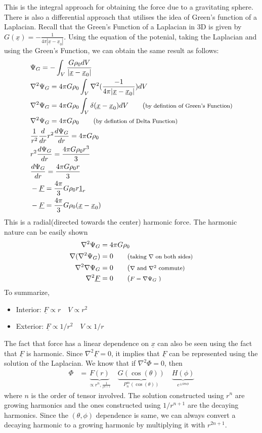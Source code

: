 \documentclass[11pt,a4paper]{article}
\newcommand{\vect}[1]{\underline{#1}}
\newcommand{\1}{\vect{1}}
\newcommand{\grad}{\nabla}
\begin{document}
This is the integral approach for obtaining the force due to a gravitating sphere. There is also a differential approach that utilises the idea of Green's function of a Laplacian. Recall that the Green's Function of a Laplacian in 3D is given by $G(\vect x) = -\frac{1}{4\pi|\vect x -\vect x_0|}$. Using the equation of the potenial, taking the Laplacian and using the Green's Function, we can obtain the same result as follows:
\begin{align*}
&\Psi_G = -\int_V \frac{G \rho_0 dV}{|{\vect x - \vect x_0}|}\\
&\grad^2 \Psi_G = 4\pi G \rho_0 \int_V \grad^2(\frac{-1}{4\pi|{\vect x - \vect x_0}|}) dV\\
&\grad^2 \Psi_G = 4\pi G \rho_0 \int_V \delta(\vect x - \vect x_0) dV \tag{\footnotesize{by defintion of Green's Function}}\\
&\grad^2 \Psi_G = 4\pi G \rho_0  \tag{\footnotesize{by defintion of Delta Function}}\\
&\frac{1}{r^2}\frac{d}{dr} r^2 \frac{d\Psi_G}{dr} = 4\pi G \rho_0 \\
&r^2 \frac{d\Psi_G}{dr} =\frac{4\pi G \rho_0 r^3}{3} \\
&\frac{d\Psi_G}{dr} =\frac{4\pi G \rho_0 r}{3} \\
&-\vect F =\frac{4\pi}{3}G \rho_0 r \1_r \\
&-\vect F =\frac{4\pi}{3}G \rho_0 (\vect x - \vect x_0) \\
\end{align*}
This is a radial(directed towards the center) harmonic force. The harmonic nature can be easily shown
\begin{align*}
\grad^2 \Psi_G &= 4\pi G \rho_0 \\
\grad (\grad^2 \Psi_G) &= 0  \tag{\footnotesize{taking $\grad$ on both sides}} \\
\grad^2 \grad \Psi_G &= 0  \tag{\footnotesize{$\grad$ and $\grad^2$ commute}}\\
\grad^2 \vect F &= 0  \tag{\footnotesize{$F = \grad \Psi_G$ }}
\end{align*}
To summarize,
\begin{itemize}
\item Interior: $\vect F \propto r \quad V \propto r^2$
\item Exterior: $\vect F \propto 1/r^2 \quad V \propto 1/r$
\end{itemize}

The fact that force has a linear dependence on $\vect x$ can also be seen using the fact that $\vect F$ is harmonic. Since $\grad^2 \vect F = 0$, it implies that $\vect F$ can be represented using the solution of the Laplacian. We know that if $\grad^2 \Phi = 0$, then
\begin{align*}
\Phi &= \underbrace{F(r)}_{\propto r^n, \frac{1}{r^{n+1}}}\quad \underbrace{G(\cos(\theta))}_{P^m_n(\cos(\theta))}\quad \underbrace{H(\phi)}_{e^{\pm i m \phi}}
\end{align*}
where $n$ is the order of tensor involved. The solution constructed using $r^n$ are growing harmonics and the ones constructed using $1/r^{n+1}$ are the decaying harmonics. Since the $(\theta, \phi)$ dependence is same, we can always convert a decaying harmonic to a growing harmonic by multiplying it with $r^{2n+1}$.
\end{document}
